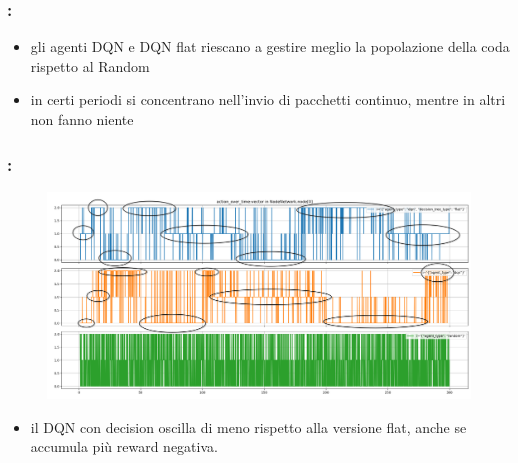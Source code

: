 \documentclass[compress]{beamer}
\begin{document}
\begin{frame}
    \frametitle{\secname: \subsecname}
    \begin{figure}
        \centering
        
        \label{fig:occupancies_allAgents_defaultConfig}
    \end{figure}
    \begin{itemize}
        \item gli agenti
        DQN e DQN flat riescano a gestire meglio la popolazione della coda rispetto al
        Random
        \item in certi periodi
        si concentrano nell'invio di pacchetti continuo, mentre in altri non fanno niente
    \end{itemize}    
\end{frame}
\begin{frame}
    \frametitle{\secname: \subsecname}
    \begin{figure}
        \centering
        \includegraphics[scale = 0.24]{figs/results_charts/actionOverTime_allAgents_defaultConfig_annotated.png}
        \label{fig:actionOverTime_allAgents_defaultConfig_annotated}
        \end{figure}
    \begin{itemize}
        \item  il DQN con decision oscilla di meno rispetto alla versione flat, anche se
        accumula più reward negativa.
    \end{itemize}    
\end{frame}
\end{document}
